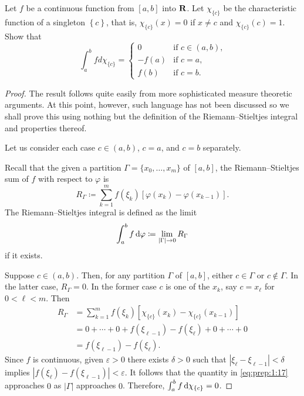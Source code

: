 \begin{problem}
Let $f$ be a continuous function from $[a,b]$ into $\mathbf{R}$. Let
$\chi_{\{c\}}$ be the characteristic function of a singleton
$\left\{c\right\}$, that is, $\chi_{\{c\}}(x)=0$ if $x\neq c$ and
$\chi_{\{c\}}(c)=1$. Show that
\[
\int_a^b f d \chi_{\{c\}}=
\begin{cases}
0&\text{if $c\in(a,b)$,}\\
-f(a)&\text{if $c=a$,}\\
f(b)&\text{if $c=b$.}
\end{cases}
\]
\end{problem}
\begin{proof}
The result follows quite easily from more sophisticated measure theoretic
arguments. At this point, however, such language has not been discussed so
we shall prove this using nothing but the definition of the
Riemann--Stieltjes integral and properties thereof.

Let us consider each case $c\in(a,b)$, $c=a$, and $c=b$ separately.

Recall that the given a partition $\Gamma=\{x_0,\dotsc,x_m\}$ of $[a,b]$,
the Riemann--Stieltjes sum of $f$ with respect to $\varphi$ is
\begin{equation}
  \label{eq:prep:1:15}
R_\Gamma\coloneqq\sum_{k=1}^mf(\xi_k)[\varphi(x_k)-\varphi(x_{k-1})].
\end{equation}
The Riemann--Stieltjes integral is defined as the limit
\begin{equation}
\label{eq:prep:1:16}
\int_a^b f\mathop{}\!\mathrm{d}\varphi\coloneqq\lim_{|\Gamma|\to 0} R_\Gamma
\end{equation}
if it exists.

Suppose $c\in(a,b)$. Then, for any partition $\Gamma$ of $[a,b]$, either
$c\in\Gamma$ or $c\notin\Gamma$. In the latter case, $R_\Gamma=0$. In the
former case $c$ is one of the $x_k$, say $c=x_\ell$ for $0<\ell<m$. Then
\begin{equation}
\label{eq:prep:1:17}
\begin{aligned}
R_\Gamma&=\sum_{k=1}^mf(\xi_k)[\chi_{\{c\}}(x_k)-\chi_{\{c\}}(x_{k-1})]\\
&=0+\dotsb+0+f(\xi_{\ell-1})-f(\xi_\ell)+0+\dotsb+0\\
&=f(\xi_{\ell-1})-f(\xi_\ell).
\end{aligned}
\end{equation}
Since $f$ is continuous, given $\varepsilon>0$ there exists $\delta>0$ such
that $|\xi_\ell-\xi_{\ell-1}|<\delta$ implies
$|f(\xi_{\ell})-f(\xi_{\ell-1})|<\varepsilon$. It follows that the quantity
in \eqref{eq:prep:1:17} approaches $0$ as $|\Gamma|$ approaches
$0$. Therefore, $\int_a^b f\mathop{}\!\mathrm{d}\chi_{\{c\}}=0$.


\end{proof}
